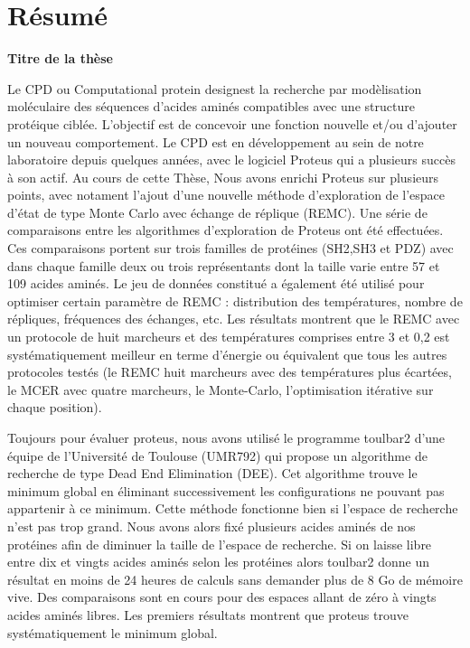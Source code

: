 

\section*{Résumé}

{\large\bf\noindent Titre de la thèse}

\bigskip

Le CPD ou \og Computational protein design\fg est la recherche par modèlisation moléculaire des séquences d'acides aminés compatibles avec une structure protéique ciblée.
L'objectif est de concevoir une fonction nouvelle et/ou d'ajouter un nouveau comportement.
Le CPD est en développement au sein de notre laboratoire depuis quelques années, avec le logiciel Proteus qui a plusieurs succès à son actif.
Au cours de cette Thèse, Nous avons enrichi Proteus sur plusieurs points, avec notament l'ajout d'une nouvelle méthode d'exploration de l'espace d'état de type Monte Carlo avec échange de réplique (REMC). Une série de comparaisons entre les algorithmes d'exploration de Proteus ont été effectuées. Ces comparaisons portent sur trois familles de protéines (SH2,SH3 et PDZ) avec dans chaque famille deux ou trois représentants dont la taille varie entre 57 et 109 acides aminés. Le jeu de données constitué a également été utilisé pour optimiser certain paramètre de REMC : distribution des températures, nombre de répliques, fréquences des échanges, etc. Les résultats montrent que le REMC avec un protocole de huit marcheurs et des températures comprises entre 3 et 0,2 est systématiquement meilleur en terme d'énergie ou équivalent que tous les autres protocoles testés (le REMC huit marcheurs avec des températures plus écartées, le MCER avec quatre marcheurs, le Monte-Carlo, l'optimisation itérative sur chaque position). 

  Toujours pour évaluer proteus, nous avons utilisé le programme toulbar2 d'une équipe de l'Université de Toulouse (UMR792) qui propose un algorithme de recherche de type Dead End Elimination (DEE). Cet algorithme trouve le minimum global en éliminant successivement les configurations ne pouvant pas appartenir à ce minimum. Cette méthode fonctionne bien si l'espace de recherche  n'est pas trop grand. Nous avons alors fixé plusieurs acides aminés de nos protéines afin de diminuer la taille de l'espace de recherche. Si on laisse libre entre dix et vingts acides aminés selon les protéines alors toulbar2 donne un résultat en moins de 24 heures de calculs sans demander plus de 8 Go de mémoire vive. Des comparaisons sont en cours pour des espaces allant de zéro à vingts acides aminés libres. Les premiers résultats montrent que proteus trouve systématiquement le minimum global. 

